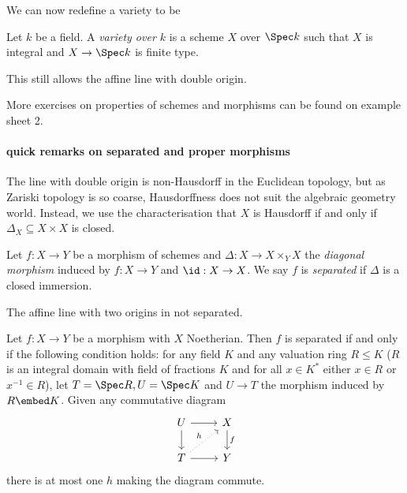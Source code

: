 \documentclass[a4paper]{article}
\begin{document}
We can now redefine a variety to be
\begin{definition}
  Let \(k\) be a field. A \emph{variety over \(k\)} is a scheme \(X\) over \(\Spec k\) such that \(X\) is integral and \(X \to \Spec k\) is finite type.
\end{definition}

\begin{note}
  This still allows the affine line with double origin.
\end{note}

More exercises on properties of schemes and morphisms can be found on example sheet 2.

\paragraph{quick remarks on separated and proper morphisms}

The line with double origin is non-Hausdorff in the Euclidean topology, but as Zariski topology is so coarse, Hausdorffness does not suit the algebraic geometry world. Instead, we use the characterisation that \(X\) is Hausdorff if and only if \(\Delta_X \subseteq X \times X\) is closed.

\begin{definition}
  Let \(f: X \to Y\) be a morphism of schemes and \(\Delta: X \to X \times_Y X\) the \emph{diagonal morphism} induced by \(f: X \to Y\) and \(\id: X \to X\). We say \(f\) is \emph{separated} if \(\Delta\) is a closed immersion.
\end{definition}

\begin{ex}
  The affine line with two origins in not separated.
\end{ex}

\begin{proposition}
  Let \(f: X \to Y\) be a morphism with \(X\) Noetherian. Then \(f\) is separated if and only if the following condition holds: for any field \(K\) and any valuation ring \(R \leq K\) (\(R\) is an integral domain with field of fractions \(K\) and for all \(x \in K^*\) either \(x \in R\) or \(x^{-1} \in R\)), let \(T = \Spec R, U = \Spec K\) and \(U \to T\) the morphism induced by \(R \embed K\). Given any commutative diagram
  \[
    \begin{tikzcd}
      U \ar[r] \ar[d] & X \ar[d, "f"] \\
      T \ar[r] \ar[ur, "h", dotted] & Y
    \end{tikzcd}
  \]
  there is at most one \(h\) making the diagram commute.
\end{proposition}
\end{document}
